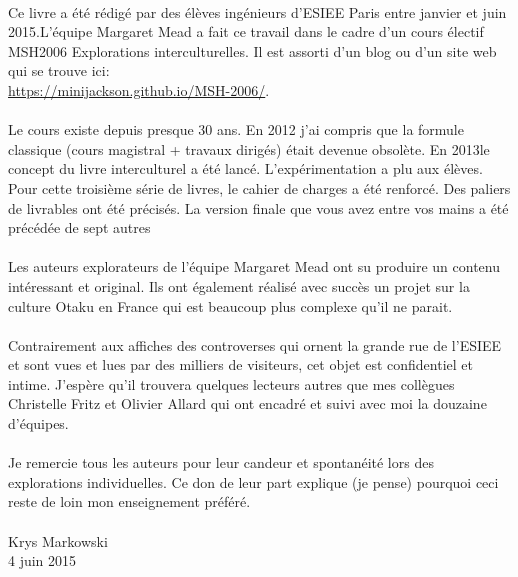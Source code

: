 \documentclass[12pt,twoside]{book}
\begin{document}
\paragraph{} Ce livre a été rédigé par des élèves ingénieurs d'ESIEE Paris
entre janvier et juin 2015.L'équipe Margaret Mead a fait ce travail dans le
cadre d'un cours électif MSH2006 Explorations interculturelles. Il est assorti
d'un blog ou d'un site web qui se trouve ici:\\
\url{https://minijackson.github.io/MSH-2006/}.

\paragraph{} Le cours existe depuis presque 30 ans.  En 2012 j'ai compris que
la formule classique (cours magistral + travaux dirigés) était devenue
obsolète.  En 2013le concept du livre interculturel a été lancé.
L'expérimentation a plu aux élèves.  Pour cette troisième série de livres, le
cahier de charges a été renforcé. Des paliers de livrables ont été précisés. La
version finale que vous avez entre vos mains a été précédée de sept autres

\paragraph{} Les auteurs explorateurs de l'équipe Margaret Mead ont su produire
un contenu intéressant et original. Ils ont également réalisé avec succès un
projet sur la culture Otaku en France qui est beaucoup plus complexe qu'il ne
parait.

\paragraph{} Contrairement aux affiches des controverses qui ornent la grande
rue de l'ESIEE et sont vues et lues par des milliers de visiteurs, cet objet
est confidentiel et intime.  J'espère qu'il trouvera quelques lecteurs autres
que mes collègues Christelle Fritz et Olivier Allard qui ont encadré et suivi
avec moi la douzaine d'équipes.

\paragraph{} Je remercie tous les auteurs pour leur candeur et spontanéité lors
des explorations individuelles. Ce don de leur part explique (je pense)
pourquoi ceci reste de loin mon enseignement préféré.

\paragraph{} Krys Markowski\\4 juin 2015

\thispagestyle{plain}



\thispagestyle{plain}

\tableofcontents

\mainmatter





\appendix


\end{document}
